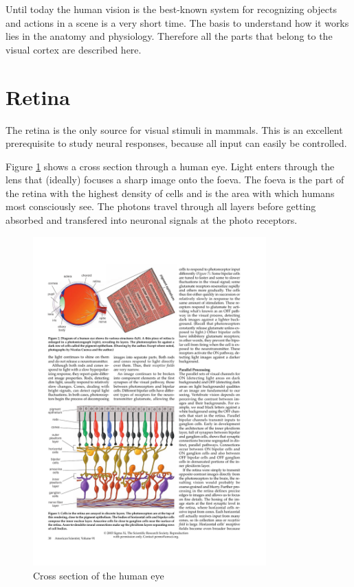 	Until today the human vision is the best-known system for recognizing objects and actions in a scene is a very short time. The basis to understand how it works lies in the anatomy and physiology. Therefore all the parts that belong to the visual cortex are described here.
	
	\section{Retina}
		
		The retina is the only source for visual stimuli in mammals. This is an excellent prerequisite to study neural responses, because all input can easily be controlled.
		
		Figure \ref{retina-cross-section} shows a cross section through a human eye. Light enters through the lens that (ideally) focuses a sharp image onto the foeva. The foeva is the part of the retina with the highest density of cells and is the area with which humans most consciously see. The photons travel through all layers before getting absorbed and transfered into neuronal signals at the photo receptors.
		
		\begin{figure}[H]
			\centering
			\includegraphics[width=0.8\textwidth, trim=1cm 21cm 8cm 2.5cm, clip]{images/kolb-2003-howtheretinaworks-p3.pdf}
			\caption{Cross section of the human eye \citep{kolb2003retina}}
			\label{retina-cross-section}
		\end{figure}
		
